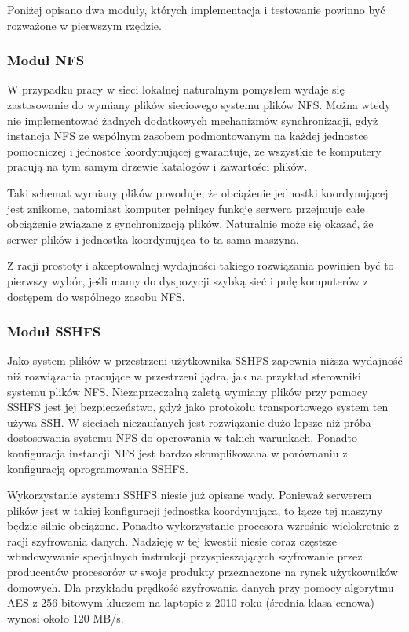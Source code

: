 \documentclass[a4paper]{article}
\begin{document}
Poniżej opisano dwa moduły, których implementacja i testowanie powinno być rozważone w pierwszym rzędzie.

\subsubsection{Moduł NFS}

W przypadku pracy w sieci lokalnej naturalnym pomysłem wydaje się zastosowanie do wymiany plików sieciowego systemu plików NFS.
Można wtedy nie implementować żadnych dodatkowych mechanizmów synchronizacji, gdyż instancja NFS ze wspólnym zasobem podmontowanym na każdej jednostce pomocniczej i jednostce koordynującej gwarantuje, że wszystkie te komputery pracują na tym samym drzewie katalogów i zawartości plików.

Taki schemat wymiany plików powoduje, że obciążenie jednostki koordynującej jest znikome, natomiast komputer pełniący funkcję serwera przejmuje całe obciążenie związane z synchronizacją plików.
Naturalnie może się okazać, że serwer plików i jednostka koordynująca to ta sama maszyna.

Z racji prostoty i akceptowalnej wydajności takiego rozwiązania powinien być to pierwszy wybór, jeśli mamy do dyspozycji szybką sieć i pulę komputerów z dostępem do wspólnego zasobu NFS.

\subsubsection{Moduł SSHFS}

Jako system plików w przestrzeni użytkownika SSHFS zapewnia niższa wydajność niż rozwiązania pracujące w przestrzeni jądra, jak na przykład sterowniki systemu plików NFS.
Niezaprzeczalną zaletą wymiany plików przy pomocy SSHFS jest jej bezpieczeństwo, gdyż jako protokołu transportowego system ten używa SSH.
W sieciach niezaufanych jest rozwiązanie dużo lepsze niż próba dostosowania systemu NFS do operowania w takich warunkach.
Ponadto konfiguracja instancji NFS jest bardzo skomplikowana w porównaniu z konfiguracją oprogramowania SSHFS.

Wykorzystanie systemu SSHFS niesie już opisane wady.
Ponieważ serwerem plików jest w takiej konfiguracji jednostka koordynująca, to łącze tej maszyny będzie silnie obciążone.
Ponadto wykorzystanie procesora wzrośnie wielokrotnie z racji szyfrowania danych.
Nadzieję w tej kwestii niesie coraz częstsze wbudowywanie specjalnych instrukcji przyspieszających szyfrowanie przez producentów procesorów w swoje produkty przeznaczone na rynek użytkowników domowych. Dla przykładu prędkość szyfrowania danych przy pomocy algorytmu AES z 256-bitowym kluczem na laptopie z 2010 roku (średnia klasa cenowa) wynosi około 120 MB/s.
\end{document}
